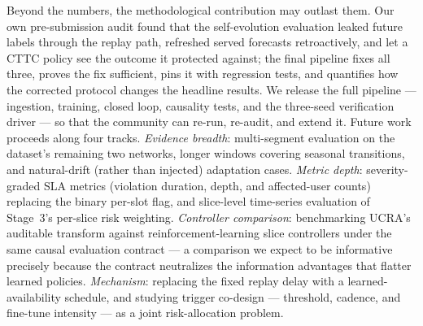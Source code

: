 Beyond the numbers, the methodological contribution may outlast them.
Our own pre-submission audit found that the self-evolution evaluation
leaked future labels through the replay path, refreshed served
forecasts retroactively, and let a CTTC policy see the outcome it
protected against; the final pipeline fixes all three, proves the
fix sufficient, pins it with regression tests, and quantifies how
the corrected protocol changes the headline results. We release the
full pipeline --- ingestion, training, closed loop, causality tests,
and the three-seed verification driver --- so that the community can
re-run, re-audit, and extend it. Future work proceeds along four
tracks. \emph{Evidence breadth}: multi-segment evaluation on the
dataset's remaining two networks, longer windows covering seasonal
transitions, and natural-drift (rather than injected) adaptation
cases. \emph{Metric depth}: severity-graded SLA metrics (violation
duration, depth, and affected-user counts) replacing the binary
per-slot flag, and slice-level time-series evaluation of Stage~3's
per-slice risk weighting. \emph{Controller comparison}: benchmarking
UCRA's auditable transform against reinforcement-learning slice
controllers under the same causal evaluation contract --- a
comparison we expect to be informative precisely because the
contract neutralizes the information advantages that flatter learned
policies. \emph{Mechanism}: replacing the fixed replay delay with a
learned-availability schedule, and studying trigger co-design ---
threshold, cadence, and fine-tune intensity --- as a joint
risk-allocation problem.
